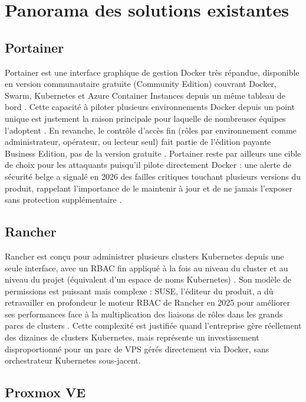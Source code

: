 \section{Panorama des solutions existantes}

\subsection{Portainer}

Portainer est une interface graphique de gestion Docker très répandue,
disponible en version communautaire gratuite (Community Edition) couvrant
Docker, Swarm, Kubernetes et Azure Container Instances depuis un même
tableau de bord \cite{portainer_setup_2026}. Cette capacité à piloter
plusieurs environnements Docker depuis un point unique est justement la
raison principale pour laquelle de nombreuses équipes l'adoptent
\cite{portainer_setup_2026}. En revanche, le contrôle d'accès fin (rôles
par environnement comme administrateur, opérateur, ou lecteur seul) fait
partie de l'édition payante Business Edition, pas de la version gratuite
\cite{portainer_rbac_2026, portainer_security_2026}. Portainer reste par
ailleurs une cible de choix pour les attaquants puisqu'il pilote directement
Docker : une alerte de sécurité belge a signalé en 2026 des failles
critiques touchant plusieurs versions du produit, rappelant l'importance
de le maintenir à jour et de ne jamais l'exposer sans protection
supplémentaire \cite{portainer_setup_2026}.

\subsection{Rancher}

Rancher est conçu pour administrer plusieurs clusters Kubernetes depuis une
seule interface, avec un RBAC fin appliqué à la fois au niveau du cluster
et au niveau du projet (équivalent d'un espace de noms Kubernetes)
\cite{rancher_zesty}. Son modèle de permissions est puissant mais complexe :
SUSE, l'éditeur du produit, a dû retravailler en profondeur le moteur RBAC
de Rancher en 2025 pour améliorer ses performances face à la multiplication
des liaisons de rôles dans les grands parcs de clusters
\cite{rancher_suse_rbac}. Cette complexité est justifiée quand l'entreprise
gère réellement des dizaines de clusters Kubernetes, mais représente un
investissement disproportionné pour un parc de VPS gérés directement via
Docker, sans orchestrateur Kubernetes sous-jacent.

\subsection{Proxmox VE}


